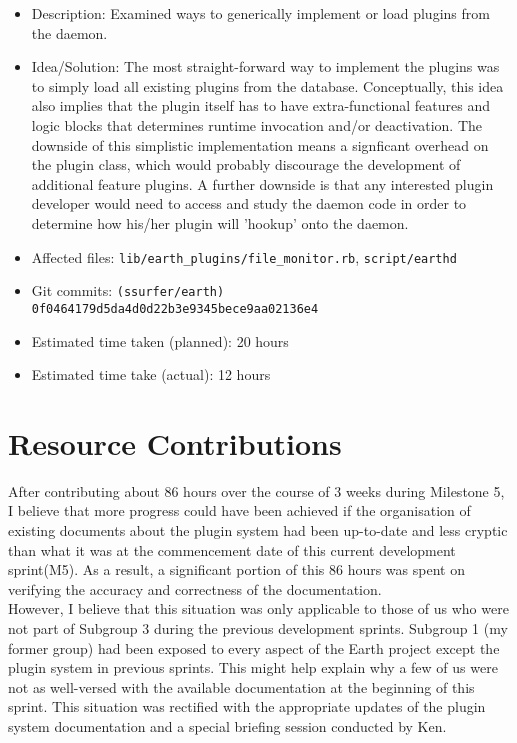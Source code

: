 \documentclass{article}
\begin{document}
\begin{itemize}
		\begin{itemize}
	   	\item Description: Examined ways to generically implement or load plugins from the daemon. 
	      \item Idea/Solution: The most straight-forward way to implement the plugins was to simply load all existing plugins from the database. Conceptually, this idea also implies that the plugin itself has to have extra-functional features and logic blocks that determines runtime invocation and/or deactivation. The downside of this simplistic implementation means a signficant overhead on the plugin class, which would probably discourage the development of additional feature plugins. A further downside is that any interested plugin developer would need to access and study the daemon code in order to determine how his/her plugin will 'hookup' onto the daemon.
	      \item Affected files: \texttt{lib/earth\_plugins/file\_monitor.rb}, \texttt{script/earthd}
	      \item Git commits: \texttt{(ssurfer/earth) 0f0464179d5da4d0d22b3e9345bece9aa02136e4}
	      \item Estimated time taken (planned): 20 hours
	      \item Estimated time take (actual): 12 hours
		\end{itemize}
\end{itemize}

\section*{Resource Contributions}

After contributing about 86 hours over the course of 3 weeks during Milestone 5, I believe that more progress could have been achieved
if the organisation of existing documents about the plugin system had been up-to-date and less cryptic than what it was at the commencement
date of this current development sprint(M5). As a result, a significant portion of this 86 hours was spent on verifying the accuracy and
correctness of the documentation. \\

However, I believe that this situation was only applicable to those of us who were not part of Subgroup 3 during the previous development sprints.
Subgroup 1 (my former group) had been exposed to every aspect of the Earth project except the plugin system in previous sprints. This might help explain
why a few of us were not as well-versed with the available documentation at the beginning of this sprint. This situation was rectified with
the appropriate updates of the plugin system documentation and a special briefing session conducted by Ken.
\end{document}
